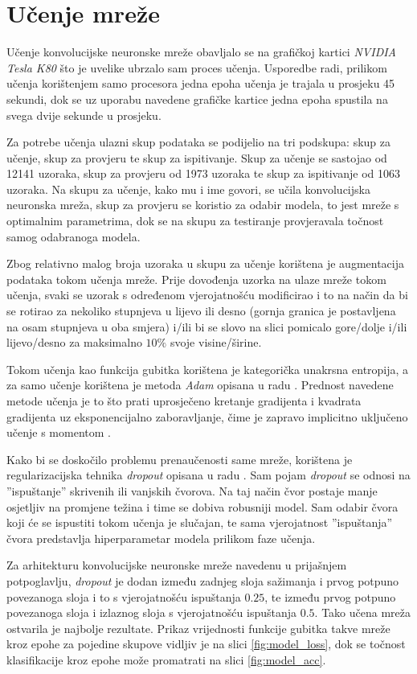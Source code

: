 \section{Učenje mreže}

Učenje konvolucijske neuronske mreže obavljalo se na grafičkoj kartici \emph{NVIDIA Tesla K80} što je uvelike ubrzalo sam proces učenja. Usporedbe radi, prilikom učenja korištenjem samo procesora jedna epoha učenja je trajala u prosjeku 45 sekundi, dok se uz uporabu navedene grafičke kartice jedna epoha spustila na svega dvije sekunde u prosjeku.

Za potrebe učenja ulazni skup podataka se podijelio na tri podskupa: skup za učenje, skup za provjeru te skup za ispitivanje. Skup za učenje se sastojao od \num{12141} uzoraka, skup za provjeru od \num{1973} uzoraka te skup za ispitivanje od \num{1063} uzoraka. Na skupu za učenje, kako mu i ime govori, se učila konvolucijska neuronska mreža, skup za provjeru se koristio za odabir modela, to jest mreže s optimalnim parametrima, dok se na skupu za testiranje provjeravala točnost samog odabranoga modela.

Zbog relativno malog broja uzoraka u skupu za učenje korištena je augmentacija podataka tokom učenja mreže. Prije dovođenja uzorka na ulaze mreže tokom učenja, svaki se uzorak s određenom vjerojatnošću modificirao i to na način da bi se rotirao za nekoliko stupnjeva u lijevo ili desno (gornja granica je postavljena na osam stupnjeva u oba smjera) i/ili bi se slovo na slici pomicalo gore/dolje i/ili lijevo/desno za maksimalno $10\%$ svoje visine/širine.

Tokom učenja kao funkcija gubitka korištena je kategorička unakrsna entropija, a za samo učenje korištena je metoda \emph{Adam} opisana u radu \citep{adam}. Prednost navedene metode učenja je to što prati uprosječeno kretanje gradijenta i kvadrata gradijenta uz eksponencijalno zaboravljanje, čime je zapravo implicitno uključeno učenje s momentom \cite{duboko}.

Kako bi se doskočilo problemu prenaučenosti same mreže, korištena je regularizacijska tehnika \emph{dropout} opisana u radu \citep{dropout}. Sam pojam \emph{dropout} se odnosi na ''ispuštanje'' skrivenih ili vanjskih čvorova. Na taj način čvor postaje manje osjetljiv na promjene težina i time se dobiva robusniji model. Sam odabir čvora koji će se ispustiti tokom učenja je slučajan, te sama vjerojatnost ''ispuštanja'' čvora predstavlja hiperparametar modela prilikom faze učenja.

Za arhitekturu konvolucijske neuronske mreže navedenu u prijašnjem potpoglavlju, \emph{dropout} je dodan između zadnjeg sloja sažimanja i prvog potpuno povezanoga sloja i to s vjerojatnošću ispuštanja $0.25$, te između prvog potpuno povezanoga sloja i izlaznog sloja s vjerojatnošću ispuštanja $0.5$. Tako učena mreža ostvarila je najbolje rezultate. Prikaz vrijednosti funkcije gubitka takve mreže kroz epohe za pojedine skupove vidljiv je na slici \ref{fig:model_loss}, dok se točnost klasifikacije kroz epohe može promatrati na slici \ref{fig:model_acc}.

